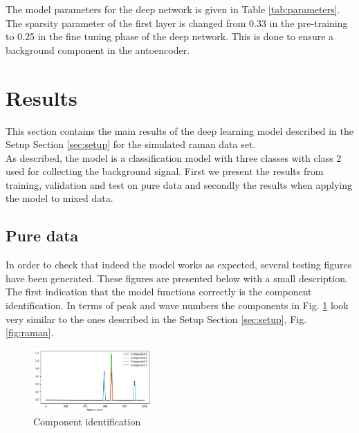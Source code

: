 \documentclass{article}
\begin{document}
The model parameters for the deep network is given in Table \ref{tab:parameters}. The sparsity parameter of the first layer is changed from 0.33 in the pre-training to 0.25 in the fine tuning phase of the deep network. This is done to ensure a background component in the autoencoder.
\vspace*{-0.2 cm}
\section{Results}
\label{sec:results}
This section contains the main results of the deep learning model described in the Setup Section \ref{sec:setup} for the simulated raman data set.\\
As described, the model is a classification model with three classes with class 2 used for collecting the background signal. First we present the results from training, validation and test on pure data and secondly the results when applying the model to mixed data.%
\vspace*{-0.2 cm}
\subsection{Pure data}
In order to check that indeed the model works as expected, several testing figures have been generated. These figures are presented below with a small description.\\
The first indication that the model functions correctly is the component identification. In terms of peak and wave numbers the components in Fig. \ref{fig:components} look very similar to the ones described in the Setup Section \ref{sec:setup}, Fig. \ref{fig:raman}. 
\begin{figure}[H]
	\centering
	\includegraphics[width=0.4\textwidth]{raman_sim_3_encode_layer_1_finetune_13.png}
	\caption{Component identification}
	\label{fig:components}
\end{figure}
%
\end{document}
